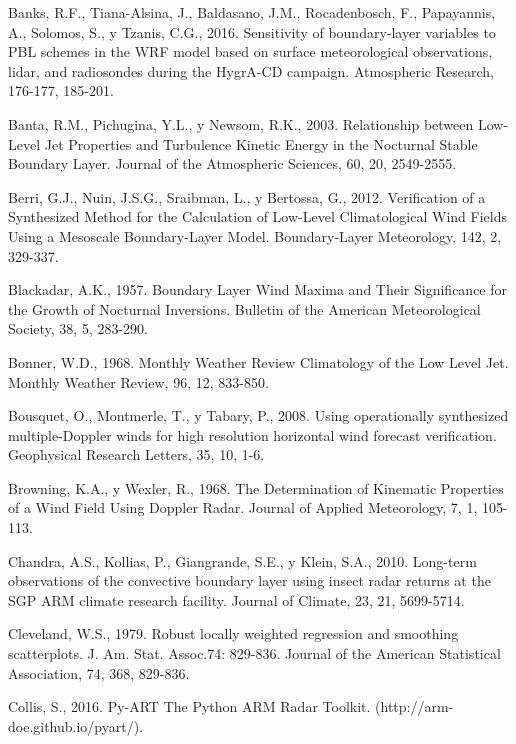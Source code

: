 \documentclass[12pt,spanish,oneside]{book}
\begin{document}
\hypertarget{ref-Banks2016}{}
Banks, R.F., Tiana-Alsina, J., Baldasano, J.M., Rocadenbosch, F.,
Papayannis, A., Solomos, S., y Tzanis, C.G., 2016. Sensitivity of
boundary-layer variables to PBL schemes in the WRF model based on
surface meteorological observations, lidar, and radiosondes during the
HygrA-CD campaign. Atmospheric Research, 176-177, 185-201.

\hypertarget{ref-Banta2003}{}
Banta, R.M., Pichugina, Y.L., y Newsom, R.K., 2003. Relationship between
Low-Level Jet Properties and Turbulence Kinetic Energy in the Nocturnal
Stable Boundary Layer. Journal of the Atmospheric Sciences, 60, 20,
2549-2555.

\hypertarget{ref-Berri2012}{}
Berri, G.J., Nuin, J.S.G., Sraibman, L., y Bertossa, G., 2012.
Verification of a Synthesized Method for the Calculation of Low-Level
Climatological Wind Fields Using a Mesoscale Boundary-Layer Model.
Boundary-Layer Meteorology, 142, 2, 329-337.

\hypertarget{ref-Blackadar1957}{}
Blackadar, A.K., 1957. Boundary Layer Wind Maxima and Their Significance
for the Growth of Nocturnal Inversions. Bulletin of the American
Meteorological Society, 38, 5, 283-290.

\hypertarget{ref-Bonner1968}{}
Bonner, W.D., 1968. Monthly Weather Review Climatology of the Low Level
Jet. Monthly Weather Review, 96, 12, 833-850.

\hypertarget{ref-Bousquet2008}{}
Bousquet, O., Montmerle, T., y Tabary, P., 2008. Using operationally
synthesized multiple-Doppler winds for high resolution horizontal wind
forecast verification. Geophysical Research Letters, 35, 10, 1-6.

\hypertarget{ref-Browning1968}{}
Browning, K.A., y Wexler, R., 1968. The Determination of Kinematic
Properties of a Wind Field Using Doppler Radar. Journal of Applied
Meteorology, 7, 1, 105-113.

\hypertarget{ref-Chandra2010}{}
Chandra, A.S., Kollias, P., Giangrande, S.E., y Klein, S.A., 2010.
Long-term observations of the convective boundary layer using insect
radar returns at the SGP ARM climate research facility. Journal of
Climate, 23, 21, 5699-5714.

\hypertarget{ref-Cleveland1979}{}
Cleveland, W.S., 1979. Robust locally weighted regression and smoothing
scatterplots. J. Am. Stat. Assoc.74: 829-836. Journal of the American
Statistical Association, 74, 368, 829-836.

\hypertarget{ref-Collis2016}{}
Collis, S., 2016. Py-ART The Python ARM Radar Toolkit.
(http://arm-doe.github.io/pyart/).
\end{document}

